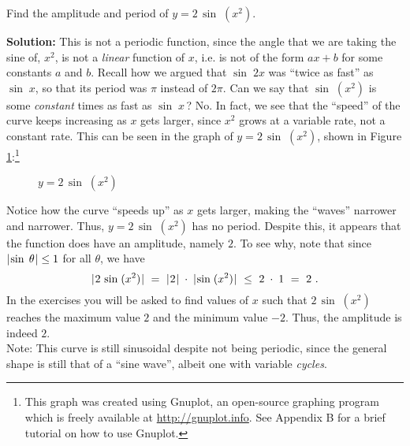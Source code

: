 \divider\vspace{-2mm}
\newpage
\begin{exmp}\label{exmp:2sinx2}
 Find the amplitude and period of $y=2\,\sin\;( x^2 )$.\vspace{1mm}
 \par\noindent\textbf{Solution:} This is not a periodic function, since the angle that we are taking
 the sine of, $x^2$, is not a \emph{linear} function of $x$, i.e. is not of the form $ax+b$ for some
 constants $a$ and $b$. Recall how we argued that $\sin\;2x$ was ``twice as fast'' as $\sin\;x$, so
 that its period was $\pi$ instead of $2\pi$. Can we say that $\sin\;( x^2 )$ is some
 \emph{constant}
 times as fast as $\sin\;x\,$? No. In fact, we see that the ``speed'' of the curve keeps increasing
 as $x$ gets larger, since $x^2$ grows at a variable rate, not a constant rate. This can be seen in
 the graph of $y=2\,\sin\;( x^2 )$, shown in Figure \ref{fig:exmp2sinx2}:\footnote{This graph was
 created using Gnuplot, an open-source graphing program which is freely available at
 \url{http://gnuplot.info}. See Appendix B for a brief tutorial on how to use Gnuplot.}\vspace{-1mm}
 
\begin{figure}[h]
 \begin{center}
  \vspace{-6mm}
 \end{center}
 \caption[]{\quad $y=2\,\sin\;( x^2 )$}
 \label{fig:exmp2sinx2}
\end{figure}

 Notice how the curve ``speeds up'' as $x$ gets larger, making the ``waves'' narrower and narrower.
 Thus, $y=2\,\sin\;( x^2 )$ has no period. Despite this, it appears that the function does have an
 amplitude, namely $2$. To see why, note that since $\lvert\mspace{1mu}\sin\;\theta\mspace{1mu}\rvert \le 1$ for all $\theta$, we
 have
 \begin{displaymath}
  \lvert\mspace{1mu}2\,\sin\;( x^2 )\mspace{1mu}\rvert ~=~ \lvert\mspace{1mu}2\mspace{1mu}\rvert \;\cdot\; \lvert\mspace{1mu}\sin\;( x^2 )\mspace{1mu}\rvert ~\le~ 2 \;\cdot\; 1 ~=~ 2 ~.
 \end{displaymath}
 In the exercises you will be asked to find values of $x$ such that $2\,\sin\;( x^2 )$ reaches the
 maximum value $2$ and the minimum value $-2$. Thus, the amplitude is indeed $2$.\\Note: This curve
 is still sinusoidal despite not being periodic, since the general shape is still that of a ``sine
 wave'', albeit one with variable \emph{cycles}.
\end{exmp}\vspace{-3mm}
\divider
\vspace{1mm}

